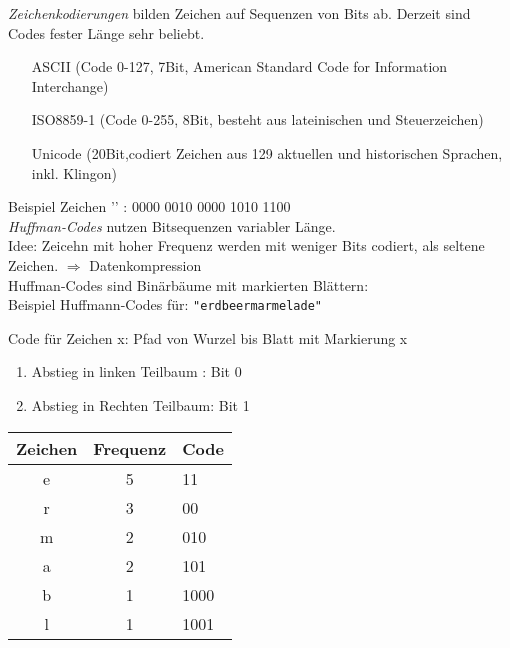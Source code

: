 \emph{Zeichenkodierungen} bilden Zeichen auf Sequenzen von Bits ab. Derzeit sind Codes fester Länge sehr beliebt.
\begin{enumerate}[]
\item[ASCII] (Code 0-127, 7Bit, American Standard Code for Information Interchange)
\item[ISO8859-1] (Code 0-255, 8Bit, besteht aus lateinischen und Steuerzeichen)
\item[Unicode] (20Bit,codiert Zeichen aus 129 aktuellen und historischen Sprachen, inkl. Klingon)
\end{enumerate}
Beispiel Zeichen '\EUR' : 0000 0010 0000 1010 1100
\bigskip\\
\emph{Huffman-Codes} nutzen Bitsequenzen variabler Länge.\\
Idee: Zeicehn mit hoher Frequenz werden mit weniger Bits codiert, als seltene Zeichen.
$\Rightarrow$ Datenkompression\\
Huffman-Codes sind Binärbäume mit markierten Blättern:\\
Beispiel Huffmann-Codes für: \lstinline|"erdbeermarmelade"|\\
\begin{figure}[h!]
\centering
{}
\end{figure}
Code für Zeichen x: Pfad von Wurzel bis Blatt mit Markierung x
\begin{enumerate}[-]
\item Abstieg in linken Teilbaum : Bit 0
\item Abstieg in Rechten Teilbaum: Bit 1
\end{enumerate}
\begin{table}[h!]
\centering
\begin{tabular}{ccl}
Zeichen&Frequenz&Code\\\hline
e & 5 & 11\\
r & 3 & 00\\
m & 2 & 010\\
a & 2 & 101\\
b & 1 & 1000\\
l & 1 & 1001
\end{tabular}
\end{table}
